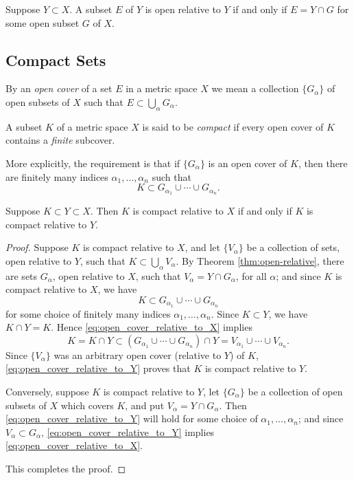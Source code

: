 \begin{theorem}\label{thm:open-relative}
Suppose $Y \subset X$.
A subset $E$ of $Y$ is open relative to $Y$ if and only if $E= Y \cap G$ for some open subset $G$ of $X$.
\end{theorem}

\subsection{Compact Sets}
\begin{definition}
    By an \emph{open cover} of a set $E$ in a metric space $X$ we mean a collection $\{G_{\alpha}\}$ of open subsets of $X$ such that $E \subset \bigcup_{\alpha}G_{\alpha}$.
\end{definition}
\begin{definition}
    A subset $K$ of a metric space $X$ is said to be \emph{compact} if every open cover of $K$ contains a \emph{finite} subcover.

    More explicitly, the requirement is that if $\{G_{\alpha}\}$ is an open cover of $K$, then there are finitely many indices $\alpha_1, \ldots, \alpha_n$ such that
    \[
    K \subset G_{\alpha_1} \cup \cdots \cup G_{\alpha_n}.
    \]
\end{definition}
\begin{theorem}
Suppose $K \subset Y \subset X$. Then $K$ is compact relative to $X$ if and only if $K$ is compact relative to $Y$.
\end{theorem}
\begin{proof}
Suppose $K$ is compact relative to $X$, and let $\{V_{\alpha}\}$ be a collection of sets, open relative to $Y$, such that $K \subset \bigcup_{\alpha}V_{\alpha}$.
By Theorem \ref{thm:open-relative}, there are sets $G_{\alpha}$, open relative to $X$, such that $V_{\alpha} = Y \cap G_{\alpha}$, for all $\alpha$;
and since $K$ is compact relative to $X$, we have
\begin{equation}\label{eq:open_cover_relative_to_X}
K \subset G_{\alpha_1} \cup \cdots \cup G_{\alpha_n}
\end{equation}
for some choice of finitely many indices $\alpha_1, \ldots, \alpha_n$.
Since $K \subset Y$, we have $K \cap Y = K$.
Hence \eqref{eq:open_cover_relative_to_X} implies
\begin{equation}\label{eq:open_cover_relative_to_Y}
    K = K \cap Y \subset (G_{\alpha_1} \cup \cdots \cup G_{\alpha_n}) \cap Y = V_{\alpha_1} \cup \cdots \cup V_{\alpha_n}.
\end{equation}
Since $\{V_{\alpha}\}$ was an arbitrary open cover (relative to $Y$) of $K$, \eqref{eq:open_cover_relative_to_Y} proves that $K$ is compact relative to $Y$.

Conversely, suppose $K$ is compact relative to $Y$, let $\{G_{\alpha}\}$ be a collection of open subsets of $X$ which covers $K$, and put $V_{\alpha} = Y \cap G_{\alpha}$.
Then \eqref{eq:open_cover_relative_to_Y} will hold for some choice of $\alpha_1, \ldots, \alpha_n$;
and since $V_{\alpha} \subset G_{\alpha}$, \eqref{eq:open_cover_relative_to_Y} implies \eqref{eq:open_cover_relative_to_X}.

This completes the proof.
\end{proof}
